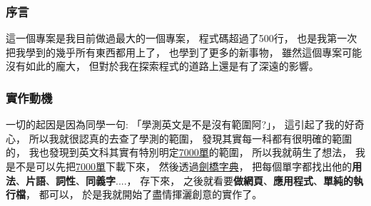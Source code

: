 \documentclass[12pt]{ctexart}
\begin{document}
\subsubsection{序言}
這一個專案是我目前做過最大的一個專案，
程式碼超過了500行，
也是我第一次把我學到的幾乎所有東西都用上了，
也學到了更多的新事物，
雖然這個專案可能沒有如此的龐大，
但對於我在探索程式的道路上還是有了深遠的影響。


\subsubsection{ 實作動機 }
一切的起因是因為同學一句: 「學測英文是不是沒有範圍阿?」，
這引起了我的好奇心，
所以我就很認真的去查了學測的範圍，
發現其實每一科都有很明確的範圍的，
我也發現到英文科其實有特別明定\href{https://www.ceec.edu.tw/SourceUse/ce37/ce37.htm}{7000單}的範圍，
所以我就萌生了想法，
我是不是可以先把\href{https://www.ceec.edu.tw/SourceUse/ce37/ce37.htm}{7000單}下載下來，
然後透過\href{https://dictionary.cambridge.org/zht/}{劍橋字典}，
把每個單字都找出他的\textbf{用法}、\textbf{片語}、\textbf{詞性}、\textbf{同義字}....，
存下來，
之後就看要\textbf{做網頁}、\textbf{應用程式}、\textbf{單純的執行檔}，
都可以，
於是我就開始了盡情揮灑創意的實作了。
\end{document}
